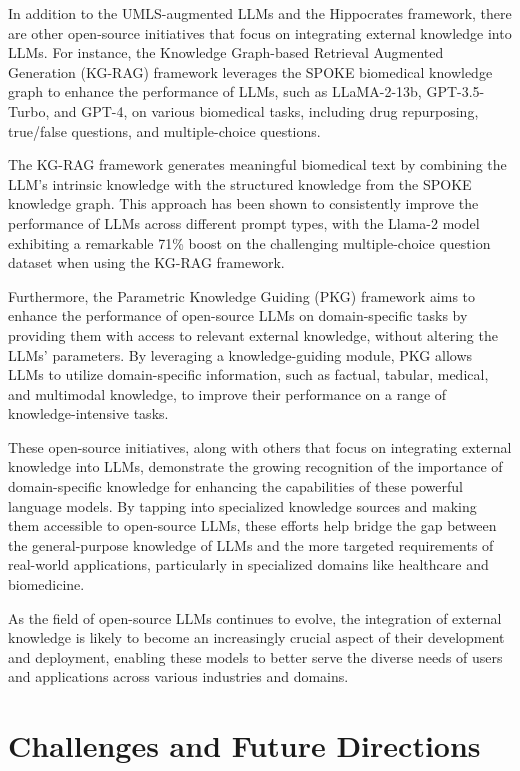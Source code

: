 \documentclass[11pt]{article}
\begin{document}
In addition to the UMLS-augmented LLMs and the Hippocrates framework, there are other open-source initiatives that focus on integrating external knowledge into LLMs. For instance, the Knowledge Graph-based Retrieval Augmented Generation (KG-RAG) framework \cite{ref325} leverages the SPOKE biomedical knowledge graph to enhance the performance of LLMs, such as LLaMA-2-13b, GPT-3.5-Turbo, and GPT-4, on various biomedical tasks, including drug repurposing, true/false questions, and multiple-choice questions.

The KG-RAG framework generates meaningful biomedical text by combining the LLM's intrinsic knowledge with the structured knowledge from the SPOKE knowledge graph. This approach has been shown to consistently improve the performance of LLMs across different prompt types, with the Llama-2 model exhibiting a remarkable 71\% boost on the challenging multiple-choice question dataset when using the KG-RAG framework.

Furthermore, the Parametric Knowledge Guiding (PKG) framework \cite{ref326} aims to enhance the performance of open-source LLMs on domain-specific tasks by providing them with access to relevant external knowledge, without altering the LLMs' parameters. By leveraging a knowledge-guiding module, PKG allows LLMs to utilize domain-specific information, such as factual, tabular, medical, and multimodal knowledge, to improve their performance on a range of knowledge-intensive tasks.

These open-source initiatives, along with others that focus on integrating external knowledge into LLMs, demonstrate the growing recognition of the importance of domain-specific knowledge for enhancing the capabilities of these powerful language models. By tapping into specialized knowledge sources and making them accessible to open-source LLMs, these efforts help bridge the gap between the general-purpose knowledge of LLMs and the more targeted requirements of real-world applications, particularly in specialized domains like healthcare and biomedicine.

As the field of open-source LLMs continues to evolve, the integration of external knowledge is likely to become an increasingly crucial aspect of their development and deployment, enabling these models to better serve the diverse needs of users and applications across various industries and domains.

\section{Challenges and Future Directions}
\end{document}
